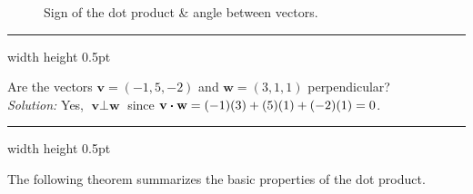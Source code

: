 \begin{figure}[h]
 \centering
 \qquad\qquad
 \qquad\qquad
 \caption[]{\quad Sign of the dot product \& angle between vectors.}
 \label{fig:dotsign}
\end{figure}

\hrule width \textwidth height 0.5pt
\begin{exmp}
 Are the vectors $\textbf{v} = (-1,5,-2)$ and $\textbf{w} = (3,1,1)$ perpendicular?\vspace{2mm}\\\emph{Solution:}
 Yes, $\textbf{v} \perp \textbf{w}$ since $\textbf{v} \bm{\cdot} \textbf{w} = (-1)(3) + (5)(1) + (-2)(1) = 0$.
\end{exmp}
\hrule width \textwidth height 0.5pt
\vspace{3mm}

The following theorem summarizes the basic properties of the dot product.

